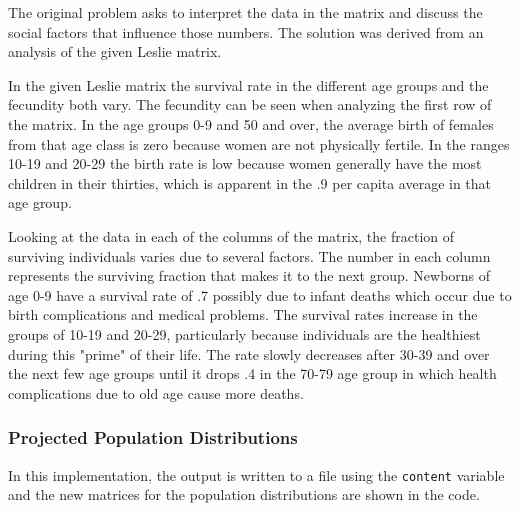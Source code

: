 \documentclass[letterpaper,12pt]{article}
\begin{document}
The original problem asks to interpret the data in the matrix and discuss the
social factors that influence those numbers.
The solution was derived from an analysis of the given Leslie matrix.

In the given Leslie matrix the survival rate in the different age groups and the
fecundity both vary.
The fecundity can be seen when analyzing the first row of the matrix.
In the age groups 0-9 and 50 and over, the average birth of females from that
age class is zero because women are not physically fertile.
In the ranges 10-19 and 20-29 the birth rate is low because women generally have
the most children in their thirties, which is apparent in the .9 per capita
average in that age group. 

Looking at the data in each of the columns of the matrix, the fraction of
surviving individuals varies due to several factors.
The number in each column represents the surviving fraction that makes it to the
next group.
Newborns of age 0-9 have a survival rate of .7 possibly due to infant deaths which
occur due to birth complications and medical problems.
The survival rates increase in the groups of 10-19 and 20-29, particularly
because individuals are the healthiest during this "prime" of their life.
The rate slowly decreases after 30-39 and over the next few age groups until it
drops .4 in the 70-79 age group in which health complications due to old age
cause more deaths.

\subsubsection{Projected Population Distributions}

In this implementation, the output is written to a file using the
\texttt{content} variable and the new matrices for the population distributions
are shown in the code.
\end{document}
